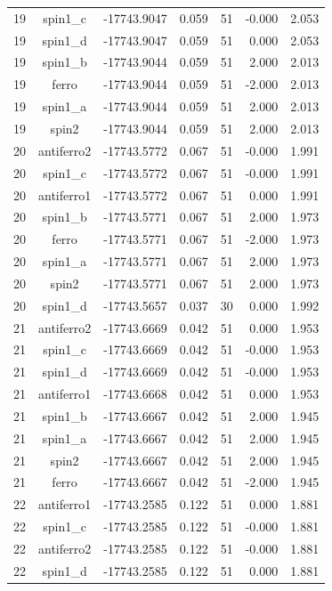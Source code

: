 \begin{longtable}{@{}ccrrrrr@{}}
19 & spin1\_c & -17743.9047 & 0.059 & 51 & -0.000 & 2.053 \\
19 & spin1\_d & -17743.9047 & 0.059 & 51 & 0.000 & 2.053 \\
19 & spin1\_b & -17743.9044 & 0.059 & 51 & 2.000 & 2.013 \\
19 & ferro & -17743.9044 & 0.059 & 51 & -2.000 & 2.013 \\
19 & spin1\_a & -17743.9044 & 0.059 & 51 & 2.000 & 2.013 \\
19 & spin2 & -17743.9044 & 0.059 & 51 & 2.000 & 2.013 \\
\rowcolor{gray!20} 20 & antiferro2 & -17743.5772 & 0.067 & 51 & -0.000 & 1.991 \\
20 & spin1\_c & -17743.5772 & 0.067 & 51 & -0.000 & 1.991 \\
20 & antiferro1 & -17743.5772 & 0.067 & 51 & 0.000 & 1.991 \\
20 & spin1\_b & -17743.5771 & 0.067 & 51 & 2.000 & 1.973 \\
20 & ferro & -17743.5771 & 0.067 & 51 & -2.000 & 1.973 \\
20 & spin1\_a & -17743.5771 & 0.067 & 51 & 2.000 & 1.973 \\
20 & spin2 & -17743.5771 & 0.067 & 51 & 2.000 & 1.973 \\
20 & spin1\_d & -17743.5657 & 0.037 & 30 & 0.000 & 1.992 \\
\rowcolor{gray!20} 21 & antiferro2 & -17743.6669 & 0.042 & 51 & 0.000 & 1.953 \\
21 & spin1\_c & -17743.6669 & 0.042 & 51 & -0.000 & 1.953 \\
21 & spin1\_d & -17743.6669 & 0.042 & 51 & -0.000 & 1.953 \\
21 & antiferro1 & -17743.6668 & 0.042 & 51 & 0.000 & 1.953 \\
21 & spin1\_b & -17743.6667 & 0.042 & 51 & 2.000 & 1.945 \\
21 & spin1\_a & -17743.6667 & 0.042 & 51 & 2.000 & 1.945 \\
21 & spin2 & -17743.6667 & 0.042 & 51 & 2.000 & 1.945 \\
21 & ferro & -17743.6667 & 0.042 & 51 & -2.000 & 1.945 \\
\rowcolor{gray!20} 22 & antiferro1 & -17743.2585 & 0.122 & 51 & 0.000 & 1.881 \\
22 & spin1\_c & -17743.2585 & 0.122 & 51 & -0.000 & 1.881 \\
22 & antiferro2 & -17743.2585 & 0.122 & 51 & -0.000 & 1.881 \\
22 & spin1\_d & -17743.2585 & 0.122 & 51 & 0.000 & 1.881 \\

\end{longtable}
